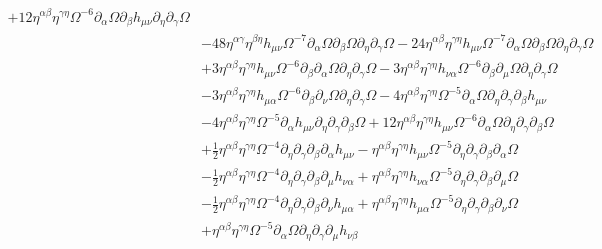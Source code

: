 \documentclass[10pt,letterpaper]{article}
\begin{document}
\begin{align}
 + 12 \eta^{\alpha \beta} \eta^{\gamma \eta} \Omega^{-6} \partial_{\alpha}\Omega \partial_{\beta}h_{\mu \nu} \partial_{\eta}\partial_{\gamma}\Omega\nonumber\\
& - 48 \eta^{\alpha \gamma} \eta^{\beta \eta} h_{\mu \nu} \Omega^{-7} \partial_{\alpha}\Omega \partial_{\beta}\Omega \partial_{\eta}\partial_{\gamma}\Omega
 - 24 \eta^{\alpha \beta} \eta^{\gamma \eta} h_{\mu \nu} \Omega^{-7} \partial_{\alpha}\Omega \partial_{\beta}\Omega \partial_{\eta}\partial_{\gamma}\Omega\nonumber\\
& + 3 \eta^{\alpha \beta} \eta^{\gamma \eta} h_{\mu \nu} \Omega^{-6} \partial_{\beta}\partial_{\alpha}\Omega \partial_{\eta}\partial_{\gamma}\Omega
 - 3 \eta^{\alpha \beta} \eta^{\gamma \eta} h_{\nu \alpha} \Omega^{-6} \partial_{\beta}\partial_{\mu}\Omega \partial_{\eta}\partial_{\gamma}\Omega\nonumber\\
& - 3 \eta^{\alpha \beta} \eta^{\gamma \eta} h_{\mu \alpha} \Omega^{-6} \partial_{\beta}\partial_{\nu}\Omega \partial_{\eta}\partial_{\gamma}\Omega
 - 4 \eta^{\alpha \beta} \eta^{\gamma \eta} \Omega^{-5} \partial_{\alpha}\Omega \partial_{\eta}\partial_{\gamma}\partial_{\beta}h_{\mu \nu}\nonumber\\
& - 4 \eta^{\alpha \beta} \eta^{\gamma \eta} \Omega^{-5} \partial_{\alpha}h_{\mu \nu} \partial_{\eta}\partial_{\gamma}\partial_{\beta}\Omega
 + 12 \eta^{\alpha \beta} \eta^{\gamma \eta} h_{\mu \nu} \Omega^{-6} \partial_{\alpha}\Omega \partial_{\eta}\partial_{\gamma}\partial_{\beta}\Omega\nonumber\\
& + \tfrac{1}{2} \eta^{\alpha \beta} \eta^{\gamma \eta} \Omega^{-4} \partial_{\eta}\partial_{\gamma}\partial_{\beta}\partial_{\alpha}h_{\mu \nu}
 -  \eta^{\alpha \beta} \eta^{\gamma \eta} h_{\mu \nu} \Omega^{-5} \partial_{\eta}\partial_{\gamma}\partial_{\beta}\partial_{\alpha}\Omega\nonumber\\
& -  \tfrac{1}{2} \eta^{\alpha \beta} \eta^{\gamma \eta} \Omega^{-4} \partial_{\eta}\partial_{\gamma}\partial_{\beta}\partial_{\mu}h_{\nu \alpha}
 + \eta^{\alpha \beta} \eta^{\gamma \eta} h_{\nu \alpha} \Omega^{-5} \partial_{\eta}\partial_{\gamma}\partial_{\beta}\partial_{\mu}\Omega\nonumber\\
& -  \tfrac{1}{2} \eta^{\alpha \beta} \eta^{\gamma \eta} \Omega^{-4} \partial_{\eta}\partial_{\gamma}\partial_{\beta}\partial_{\nu}h_{\mu \alpha}
 + \eta^{\alpha \beta} \eta^{\gamma \eta} h_{\mu \alpha} \Omega^{-5} \partial_{\eta}\partial_{\gamma}\partial_{\beta}\partial_{\nu}\Omega\nonumber\\
& + \eta^{\alpha \beta} \eta^{\gamma \eta} \Omega^{-5} \partial_{\alpha}\Omega \partial_{\eta}\partial_{\gamma}\partial_{\mu}h_{\nu \beta}

\end{align}
\end{document}
